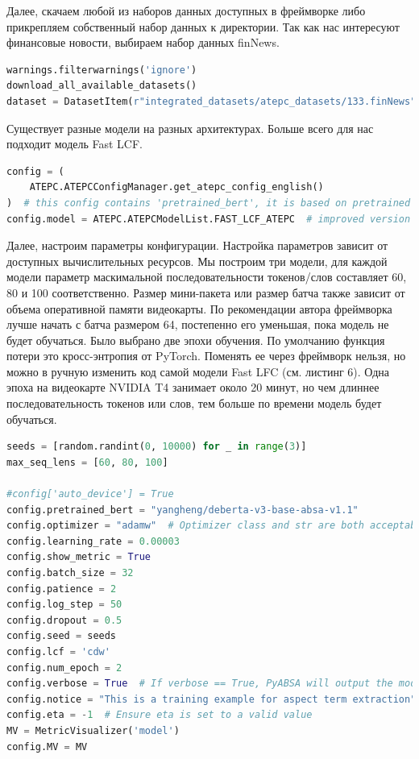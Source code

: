 Далее, скачаем любой из наборов данных доступных в фреймворке либо прикрепляем собственный набор данных к директории. Так как нас интересуют финансовые новости, выбираем набор данных finNews.
\begin{lstlisting}[label=listing3, caption=Выбар набора данных, language = Python]
warnings.filterwarnings('ignore')
download_all_available_datasets()
dataset = DatasetItem(r"integrated_datasets/atepc_datasets/133.finNews")
\end{lstlisting}

Существует разные модели на разных архитектурах. Больше всего для нас подходит модель Fast LCF.
\begin{lstlisting}[label=listing4, caption=Выбар модели, language = Python]
config = (
    ATEPC.ATEPCConfigManager.get_atepc_config_english()
)  # this config contains 'pretrained_bert', it is based on pretrained models
config.model = ATEPC.ATEPCModelList.FAST_LCF_ATEPC  # improved version of LCF-ATEPC
\end{lstlisting}

Далее, настроим параметры конфигурации. Настройка параметров зависит от доступных вычислительных ресурсов. Мы построим три модели, для каждой модели параметр маскимальной последовательности токенов/слов составляет 60, 80 и 100 соответственно. Размер мини-пакета или размер батча также зависит от объема оперативной памяти видеокарты. По рекомендации автора фреймворка лучше начать с батча размером 64, постепенно его уменьшая, пока модель не будет обучаться. Было выбрано две эпохи обучения. По умолчанию функция потери это кросс-энтропия от PyTorch. Поменять ее через фреймворк нельзя, но можно в ручную изменить код самой модели Fast LFC (см. листинг 6). Одна эпоха на видеокарте NVIDIA T4 занимает около 20 минут, но чем длиннее последовательность токенов или слов, тем больше по времени модель будет обучаться. 
\begin{lstlisting}[label=listing5, caption=Параметры модели данных, language = Python]
seeds = [random.randint(0, 10000) for _ in range(3)]
max_seq_lens = [60, 80, 100]

#config['auto_device'] = True
config.pretrained_bert = "yangheng/deberta-v3-base-absa-v1.1"
config.optimizer = "adamw"  # Optimizer class and str are both acceptable (from pytorch)
config.learning_rate = 0.00003
config.show_metric = True
config.batch_size = 32
config.patience = 2
config.log_step = 50
config.dropout = 0.5
config.seed = seeds
config.lcf = 'cdw'
config.num_epoch = 2
config.verbose = True  # If verbose == True, PyABSA will output the model structure and several processed data examples
config.notice = "This is a training example for aspect term extraction"
config.eta = -1  # Ensure eta is set to a valid value
MV = MetricVisualizer('model')
config.MV = MV
\end{lstlisting}

